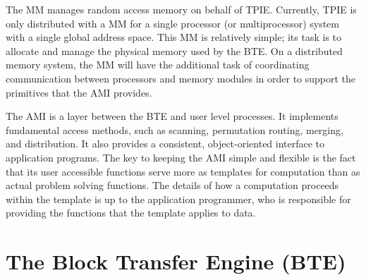 The MM manages random access memory on behalf of
TPIE.
Currently, TPIE is only distributed with a MM for a single processor (or
multiprocessor) system with a single global address space. This MM is
relatively simple; its task is to allocate and manage the physical memory
used by the BTE. On a distributed memory system, the MM will have the
additional task of coordinating communication between processors and memory
modules in order to support the primitives that the AMI provides.

The AMI is a layer between the BTE and user
level processes.  It implements fundamental access methods, such as
scanning, permutation routing, merging, and distribution. It also provides
a consistent, object-oriented interface to application programs.
The key to keeping the AMI simple and flexible is the fact that its
user accessible functions serve more as templates for computation than
as actual problem solving functions.  The details of how a computation
proceeds within the template is up to the application programmer, who
is responsible for providing the functions that the template applies
to data.

\section{The Block Transfer Engine (BTE)}
\label{sec:ref-bte}

\tobeextended

